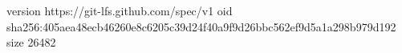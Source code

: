 version https://git-lfs.github.com/spec/v1
oid sha256:405aea48ecb46260e8c6205c39d24f40a9f9d26bbc562ef9d5a1a298b979d192
size 26482
